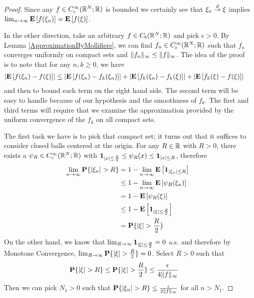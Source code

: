 \documentclass{amsart}
\theoremstyle{remark}
\theoremstyle{definition}
\begin{document}
\begin{proof}
Since any $f \in  C^\infty_c(\mathbb{R}^N; \mathbb{R})$ is bounded we
certainly see that $\xi_n \overset{d}\to \xi$ implies $\lim_{n \to \infty}
  \textbf{E}\left[f(\xi_n)\right] = \textbf{E}\left[f(\xi)\right]$.

In the other direction, take an arbitrary $f \in C_b(\mathbb{R}^N;
\mathbb{R})$ and pick $\epsilon > 0$.  By Lemma \ref{ApproximationByMollifiers}, we can find $f_n
\in C^\infty_c(\mathbb{R}^N; \mathbb{R})$ such that $f_n$ converges uniformly
on compact sets and $\lVert f_n \rVert_\infty \leq \lVert f \rVert_\infty$.  
The idea of the proof is to note that for any
$n, k \geq 0$, we have
\begin{align*}
\left \vert \textbf{E}\left[f(\xi_n) - f(\xi)\right] \right \vert &\leq \left \vert \textbf{E}\left[f(\xi_n)
    - f_k(\xi_n)\right] \right \vert + \left \vert \textbf{E}\left[f_k(\xi_n)    - f_k(\xi)\right] \right \vert + \left \vert \textbf{E}\left[f_k(\xi) - f(\xi)\right] \right \vert
\end{align*}
and then to bound each term on the right hand side.  The second term
will be easy to handle because of our hypothesis and the smoothness of
$f_k$.   The first and
third terms will require that we examine the approximation provided by
the uniform convergence of the $f_k$ on all compact sets.


The first task we have
is to pick that compact set; it turns out that it suffices to consider
closed balls centered at the origin.  For any $R \in \mathbb{R}$ with $R>0$,
 there exists a $\psi_R \in C^\infty_c(\mathbb{R}^N;\mathbb{R})$
with $\textbf{1}_{\left \vert x \right \vert \leq \frac{R}{2}} \leq \psi_R(x) \leq
\textbf{1}_{\left \vert x \right \vert \leq R}$,
therefore 
\begin{align*}
\lim_{n \to \infty} \textbf{P}\{\left \vert \xi_n \right \vert > R\} &= 1 - \lim_{n \to
  \infty} \textbf{E}\left[\textbf{1}_{\left \vert \xi_n \right \vert \leq R}\right] \\
&\leq 1 - \lim_{n \to
  \infty} \textbf{E}\left[\psi_R(\xi_n)\right] \\
&=1 - \textbf{E}\left[\psi_R(\xi)\right] \\
&\leq 1 - \textbf{E}\left[\textbf{1}_{\left \vert \xi \right \vert \leq \frac{R}{2}}\right] \\
&=\textbf{P}\{\left \vert \xi \right \vert > \frac{R}{2}\} 
\end{align*}
On the other hand, we know that $\lim_{R \to \infty}
\textbf{1}_{\left \vert \xi \right \vert \leq \frac{R}{2}} = 0$ a.s. and therefore by
Monotone Convergence, $\lim_{R \to \infty} \textbf{P}\{\left \vert \xi \right \vert >
  \frac{R}{2}\} = 0$.  Select $R > 0$ such that  
\begin{align*}
\textbf{P}\{\left \vert \xi \right \vert >R\} &\leq \textbf{P}\{\left \vert \xi \right \vert >\frac{R}{2}\} \leq \frac{\epsilon}{4\lVert f \rVert_\infty}
\end{align*}
Then we can
pick $N_1 > 0$ such that $\textbf{P}\{\left \vert \xi_n \right \vert >R\} \leq \frac{\epsilon}{2\lVert f \rVert_\infty}$ for all $n > N_1$.


\end{proof}
\end{document}
